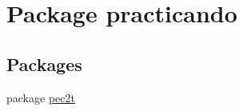 \hypertarget{namespacepracticando}{}\section{Package practicando}
\label{namespacepracticando}
\subsection*{Packages}
\begin{DoxyCompactItemize}
\item 
package \mbox{\hyperlink{namespacepracticando_1_1pec2t}{pec2t}}
\end{DoxyCompactItemize}
